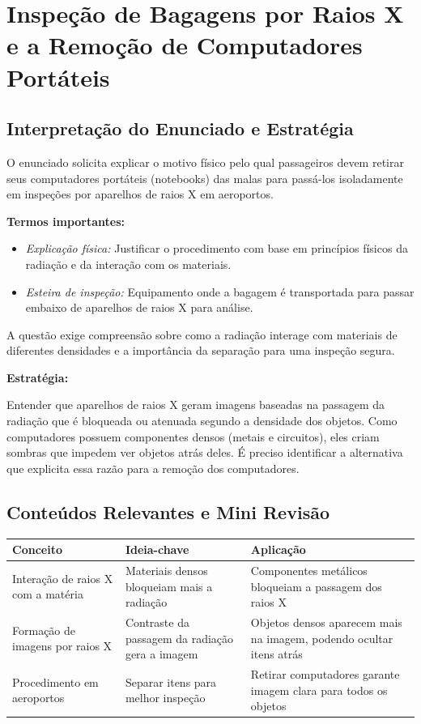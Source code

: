 \documentclass{article}
\begin{document}
\section*{Inspeção de Bagagens por Raios X e a Remoção de Computadores Portáteis}

\subsection*{Interpretação do Enunciado e Estratégia}

O enunciado solicita explicar o motivo físico pelo qual passageiros devem retirar seus computadores portáteis (notebooks) das malas para passá-los isoladamente em inspeções por aparelhos de raios X em aeroportos.

\textbf{Termos importantes:}
\begin{itemize}
\item \textit{Explicação física:} Justificar o procedimento com base em princípios físicos da radiação e da interação com os materiais.
\item \textit{Esteira de inspeção:} Equipamento onde a bagagem é transportada para passar embaixo de aparelhos de raios X para análise.
\end{itemize}

A questão exige compreensão sobre como a radiação interage com materiais de diferentes densidades e a importância da separação para uma inspeção segura.

\textbf{Estratégia:}

Entender que aparelhos de raios X geram imagens baseadas na passagem da radiação que é bloqueada ou atenuada segundo a densidade dos objetos. Como computadores possuem componentes densos (metais e circuitos), eles criam sombras que impedem ver objetos atrás deles. É preciso identificar a alternativa que explicita essa razão para a remoção dos computadores.

\subsection*{Conteúdos Relevantes e Mini Revisão}

\begin{tabular}{p{5cm} p{6cm} p{5cm}}
\textbf{Conceito} & \textbf{Ideia-chave} & \textbf{Aplicação} \\
\hline
Interação de raios X com a matéria & Materiais densos bloqueiam mais a radiação & Componentes metálicos bloqueiam a passagem dos raios X \\
Formação de imagens por raios X & Contraste da passagem da radiação gera a imagem & Objetos densos aparecem mais na imagem, podendo ocultar itens atrás \\
Procedimento em aeroportos & Separar itens para melhor inspeção & Retirar computadores garante imagem clara para todos os objetos \\
\end{tabular}
\end{document}

